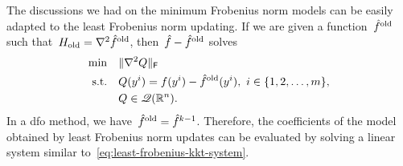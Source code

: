 The discussions we had on the minimum Frobenius norm models can be easily adapted to the least Frobenius norm updating.
If we are given a function~$\objm[\text{old}]$ such that~$H_{\text{old}} = \nabla^2 \objm[\text{old}]$, then~$\objm - \objm[\text{old}]$ solves
\begin{subequations}
    \label{eq:symmetric-broyden-models-reformulation}
    \begin{align}
        \min        & \quad \norm{\nabla^2 Q}_{\mathsf{F}}\\
        \text{s.t.} & \quad Q(y^i) = \obj(y^i) - \objm[\text{old}](y^i), ~ i \in \set{1, 2, \dots, m},\\
                    & \quad Q \in \qpoly.
    \end{align}
\end{subequations}
In a \gls{dfo} method, we have~$\objm[\text{old}] = \objm[k - 1]$.
Therefore, the coefficients of the model obtained by least Frobenius norm updates can be evaluated by solving a linear system similar to~\cref{eq:least-frobenius-kkt-system}.

